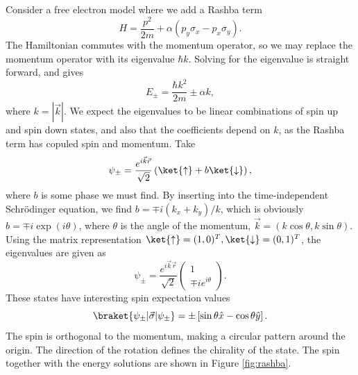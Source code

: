 Consider a free electron model where we add a Rashba term
\begin{equation}
  H = \frac{p^2}{2m} + \alpha (p_y \sigma _x - p_x \sigma _y).
\end{equation}
The Hamiltonian commutes with the momentum operator, so we may replace the momentum operator with its eigenvalue $\hbar k$.
Solving for the eigenvalue is straight forward, and gives
\begin{equation}
  E_{\pm} = \frac{\hbar k^2}{2m} \pm \alpha k,
\end{equation}
where $k=|\vec{k}|$.
We expect the eigenvalues to be linear combinations of spin up and spin down states, and also that the coefficients depend on $k$, as the Rashba term has copuled spin and momentum.
Take
\begin{equation}
  \psi_{\pm} = \frac{e^{i \vec{k} \vec{r}}}{\sqrt{2}} \left( \ket{\uparrow} + b \ket{\downarrow} \right),
\end{equation}
where $b$ is some phase we must find.
By inserting into the time-independent Schrödinger equation, we find $b = \mp i (k_x + k_y ) /k$, which is obviously $b=\mp i \exp (i \theta )$, where $\theta $ is the angle of the momentum, $\vec{k} = (k \cos \theta , k \sin \theta)$.
Using the matrix representation $\ket{\uparrow} = (1,0)^T, \ket{\downarrow} = (0,1)^T$, the eigenvalues are given as
\begin{equation}
  \psi _{\pm} =
  \frac{e^{i \vec{k} \vec{r}}}{\sqrt{2}}
  \begin{pmatrix}
    1\\
    \mp i e^{i \theta }
  \end{pmatrix}.
\end{equation}
These states have interesting spin expectation values
\begin{equation}
  \braket{\psi_{\pm} | \vec{\sigma} | \psi _{\pm}}
  =
  \pm
  \left[  
    \sin\theta \hat{x} - \cos \theta \hat{y}
  \right].
\end{equation}
The spin is orthogonal to the momentum, making a circular pattern around the origin.
The direction of the rotation defines the chirality of the state.
The spin together with the energy solutions are shown in Figure \ref{fig:rashba}.


